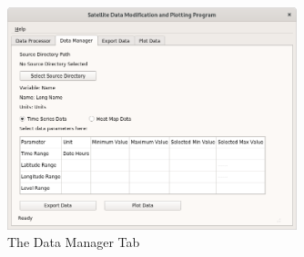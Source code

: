 \documentclass[../00_main.tex]{subfiles}
\begin{document}
\begin{figure}[H]
    \center
    \includegraphics[width=0.75\textwidth]{../graphics/dm01}
    \caption{The Data Manager Tab}
    \label{dm01}
\end{figure}
\end{document}
